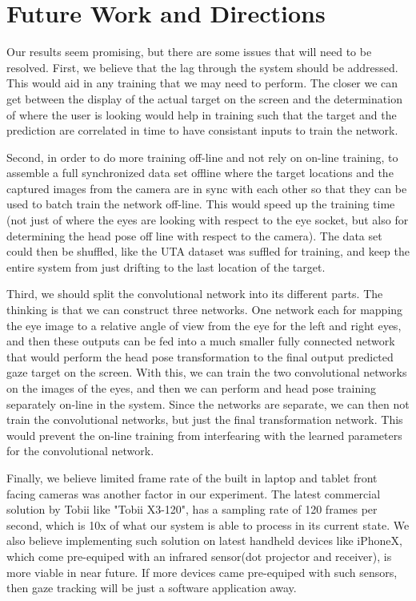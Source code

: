 \documentclass[10pt,twocolumn,letterpaper]{article}
\begin{document}
\section{Future Work and Directions}
Our results seem promising, but there are some issues that will need
to be resolved. First, we believe that the lag through the system
should be addressed. This would aid in any training that we may need
to perform. The closer we can get between the display of the actual
target on the screen and the determination of where the user is
looking would help in training such that the target and the prediction
are correlated in time to have consistant inputs to train the
network.

Second, in order to do more training off-line and not rely on on-line
training, to assemble a full synchronized data set offline where the
target locations and the captured images from the camera are in sync
with each other so that they can be used to batch train the network
off-line. This would speed up the training time (not just of where the
eyes are looking with respect to the eye socket, but also for
determining the head pose off line with respect to the camera). The
data set could then be shuffled, like the UTA dataset was suffled for
training, and keep the entire system from just drifting to the last
location of the target.

Third, we should split the convolutional network into its different
parts. The thinking is that we can construct three networks. One
network each for mapping the eye image to a relative angle of view
from the eye for the left and right eyes, and then these outputs can be fed
into a much smaller fully connected network that would perform the
head pose transformation to the final output predicted gaze target on
the screen. With this, we can train the two convolutional networks on
the images of the eyes, and then we can perform and head pose training
separately on-line in the system. Since the networks are separate, we
can then not train the convolutional networks, but just the final
transformation network. This would prevent the on-line training from
interfearing with the learned parameters for the convolutional network.

Finally, we believe limited frame rate of the built in laptop and tablet front facing cameras was another 
factor in our experiment. The latest commercial solution by Tobii like "Tobii X3-120", has a sampling 
rate of 120 frames per second, which is 10x of what our system is able to process in its current state. 
We also believe implementing such solution on latest handheld devices like iPhoneX, which 
come pre-equiped with an infrared sensor(dot projector and receiver), is more viable in near future. 
If more devices came pre-equiped with such sensors, then gaze tracking will be just a software application away. 
\end{document}

